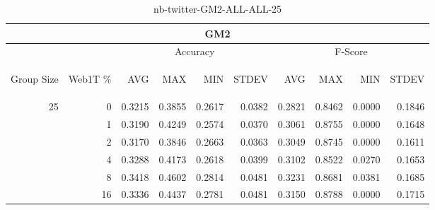 \begin{center}
\begin{table}[htbp]
\begin{center}
\begin{tabular}{ | r | r | r | r | r | r | r | r | r | r |}
\hline
\multicolumn{10}{|c|}{GM2}\\
\hline
 & & \multicolumn{4}{|c|}{Accuracy} & \multicolumn{4}{|c|}{F-Score}\\ \cline{3-10}
\begin{sideways}Group Size\end{sideways} & \begin{sideways}Web1T \%\end{sideways} & \begin{sideways}AVG\end{sideways} & \begin{sideways}MAX\end{sideways} & \begin{sideways}MIN\end{sideways} & \begin{sideways}STDEV\end{sideways} & \begin{sideways}AVG\end{sideways} & \begin{sideways}MAX\end{sideways} & \begin{sideways}MIN\end{sideways} & \begin{sideways}STDEV\end{sideways}\\
\hline
\multirow{5}{*}{25}
 & 0 & 0.3215 & 0.3855 & 0.2617 & 0.0382 & 0.2821 & 0.8462 & 0.0000 & 0.1846\\ \cline{2-10}
 & 1 & 0.3190 & 0.4249 & 0.2574 & 0.0370 & 0.3061 & 0.8755 & 0.0000 & 0.1648\\ \cline{2-10}
 & 2 & 0.3170 & 0.3846 & 0.2663 & 0.0363 & 0.3049 & 0.8745 & 0.0000 & 0.1611\\ \cline{2-10}
 & 4 & 0.3288 & 0.4173 & 0.2618 & 0.0399 & 0.3102 & 0.8522 & 0.0270 & 0.1653\\ \cline{2-10}
 & 8 & 0.3418 & 0.4602 & 0.2814 & 0.0481 & 0.3231 & 0.8681 & 0.0381 & 0.1685\\ \cline{2-10}
 & 16 & 0.3336 & 0.4437 & 0.2781 & 0.0481 & 0.3150 & 0.8788 & 0.0000 & 0.1715\\ \cline{2-10}
\hline
\end{tabular}
\caption{nb-twitter-GM2-ALL-ALL-25}
\label{table:nb-twitter-GM2-ALL-ALL-25}
\end{center}
\end{table}
\end{center}

